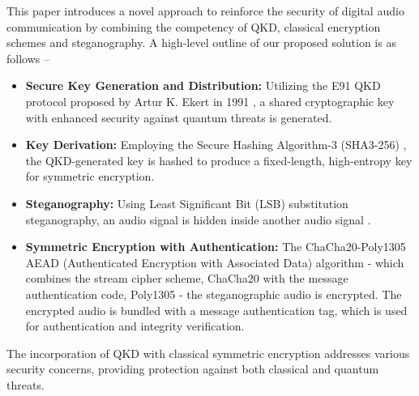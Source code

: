 \documentclass[a4paper]{cas-sc}
\begin{document}
This paper introduces a novel approach to reinforce the security of digital audio communication by combining the competency of QKD, classical encryption schemes and steganography. A high-level outline of our proposed solution is as follows --
\begin{itemize}
    \item \textbf{Secure Key Generation and Distribution:} Utilizing the E91 QKD protocol proposed by Artur K. Ekert in 1991 \cite{Ekert1991}, a shared cryptographic key with enhanced security against quantum threats is generated.
    \item \textbf{Key Derivation:} Employing the Secure Hashing Algorithm-3 (SHA3-256) \cite{dworkin2015sha}, the QKD-generated key is hashed to produce a fixed-length, high-entropy key for symmetric encryption.
    \item \textbf{Steganography:} Using Least Significant Bit (LSB) substitution steganography, an audio signal is hidden inside another audio signal \cite{cvejic2002increasing}.
    \item \textbf{Symmetric Encryption with Authentication:} The ChaCha20-Poly1305 AEAD (Authenticated Encryption with Associated Data) algorithm \cite{rfc7539} - which combines the stream cipher scheme, ChaCha20 \cite{bernstein2008chacha} with the message authentication code, Poly1305 \cite{bernstein2005poly1305} - the steganographic audio is encrypted. The encrypted audio is bundled with a message authentication tag, which is used for authentication and integrity verification.
\end{itemize}
The incorporation of QKD with classical symmetric encryption addresses various security concerns, providing protection against both classical and quantum threats.
\end{document}
